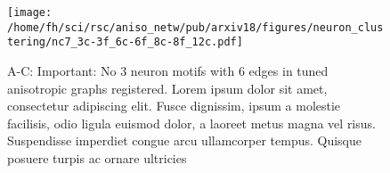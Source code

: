 

\begin{figure}[h!]
  \centering
\texttt{[image: /home/fh/sci/rsc/aniso\_netw/pub/arxiv18/figures/neuron\_clustering/nc7\_3c-3f\_6c-6f\_8c-8f\_12c.pdf]}
\caption{A-C: Important: No 3 neuron motifs with 6 edges in tuned anisotropic
graphs registered. Lorem ipsum dolor sit amet, consectetur adipiscing elit. Fusce dignissim, ipsum a molestie facilisis, odio ligula euismod dolor, a laoreet metus magna vel risus. Suspendisse imperdiet congue arcu ullamcorper tempus. Quisque posuere turpis ac ornare ultricies}
\label{fig_cluster}%
\end{figure}


\newpage

